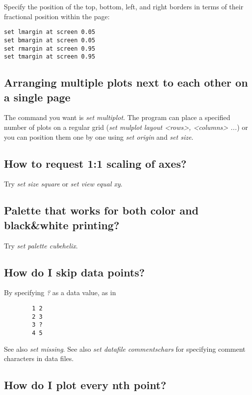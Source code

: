 \documentclass[a4paper,11pt]{article}
\begin{document}
Specify the position of the top, bottom, left, and right borders in
terms of their fractional position within the page:

\small
\begin{verbatim}
set lmargin at screen 0.05
set bmargin at screen 0.05
set rmargin at screen 0.95
set tmargin at screen 0.95
\end{verbatim}
\normalsize

\subsection{Arranging multiple plots next to each other on a single page}

The command you want is {\em set multiplot}.  The program can place
a specified number of plots on a regular grid
({\em set mulplot layout <rows>, <columns> ...}) or you can position them
one by one using {\em set origin} and {\em set size}.

\subsection{How to request 1:1 scaling of axes?}

Try {\em set size square} or {\em set view equal xy}.

\subsection{Palette that works for both color and black\&white printing?}

Try {\em set palette cubehelix}.

\subsection{How do I skip data points?}

By specifying \textit{?} as a data value, as in
\small
\begin{verbatim}
        1 2
        2 3
        3 ?
        4 5
\end{verbatim}
\normalsize

See also \textit{set missing}.
See also \textit{set datafile commentschars} for specifying comment characters in
data files.


\subsection{How do I plot every nth point?}
\end{document}
